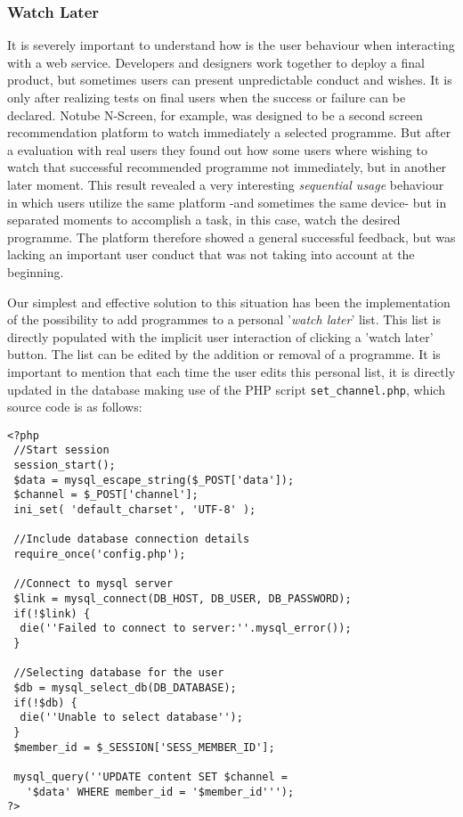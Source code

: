 \documentclass{acm_proc_article-sp}
\begin{document}
\subsubsection{Watch Later} \label{watchlater}
It is severely important to understand how is the user behaviour when interacting with a web service. Developers and designers work together to deploy a final product, but sometimes users can present unpredictable conduct and wishes\cite{norman2002design}. It is only after realizing tests on final users when the success or failure can be declared. Notube N-Screen, for example, was designed to be a second screen recommendation platform to watch immediately a selected programme. But after a evaluation with real users they found out how some users where wishing to watch that successful recommended programme not immediately, but in another later moment. This result revealed a very interesting \textit{sequential usage} behaviour in which users utilize the same platform -and sometimes the same device- but in separated moments to accomplish a task, in this case, watch the desired programme. The platform therefore showed a general successful feedback, but was lacking an important user conduct that was not taking into account at the beginning. 

Our simplest and effective solution to this situation\cite{krug2014don} has been the implementation of the possibility to add programmes to a personal '\textit{watch later}' list. This list is directly populated with the implicit user interaction of clicking a 'watch later' button. The list can be edited by the addition or removal of a programme. It is important to mention that each time the user edits this personal list, it is directly updated in the database making use of the PHP script \texttt{set\_channel.php}, which source code is as follows:

\begin{lstlisting}
<?php
 //Start session
 session_start();
 $data = mysql_escape_string($_POST['data']);
 $channel = $_POST['channel'];
 ini_set( 'default_charset', 'UTF-8' );
	
 //Include database connection details
 require_once('config.php');

 //Connect to mysql server
 $link = mysql_connect(DB_HOST, DB_USER, DB_PASSWORD);
 if(!$link) {
  die(''Failed to connect to server:''.mysql_error());
 }
	
 //Selecting database for the user
 $db = mysql_select_db(DB_DATABASE);
 if(!$db) {
  die(''Unable to select database'');
 }
 $member_id = $_SESSION['SESS_MEMBER_ID'];

 mysql_query(''UPDATE content SET $channel = 
   '$data' WHERE member_id = '$member_id''');
?>
\end{lstlisting}
\end{document}
